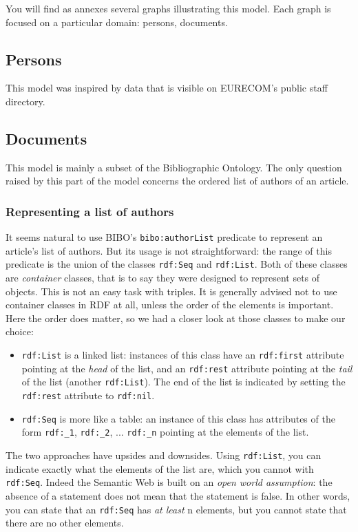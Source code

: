 \documentclass[a4paper,11pt]{report}
\begin{document}
You will find as annexes several graphs illustrating this model. Each graph is focused on a particular domain: persons, documents.
\subsection*{Persons}
This model was inspired by data that is visible on \mbox{EURECOM's} public staff directory. 

\subsection*{Documents}
This model is mainly a subset of the Bibliographic Ontology. The only question raised by this part of the model concerns the ordered list of authors of an article. 
\subsubsection*{Representing a list of authors}
It seems natural to use BIBO's \texttt{bibo:authorList} predicate to represent an article's list of authors.  But its usage is not straightforward: the range of this predicate is the union of the classes  \texttt{rdf:Seq} and  \texttt{rdf:List}. Both of these classes are \emph{container} classes, that is to say they were designed to represent sets of objects. This is not an easy task with triples. It is generally advised not to use container classes in RDF at all, unless the order of the elements is important. Here the order does matter, so we had a closer look at those classes to make our choice: 
\begin{itemize}
\item \texttt{rdf:List} is a linked list: instances of this class have an \texttt{rdf:first} attribute pointing at the \emph{head} of the list, and an \texttt{rdf:rest} attribute pointing at the \emph{tail} of the list (another \texttt{rdf:List}). The end of the list is indicated by setting the \texttt{rdf:rest} attribute to \texttt{rdf:nil}. 
\item \texttt{rdf:Seq} is more like a table: an instance of this class has attributes of the form \texttt{rdf:{\_}1}, \texttt{rdf:{\_}2}, ... \texttt{rdf:{\_}n} pointing at the elements of the list. 
\end{itemize}

The two approaches have upsides and downsides. Using \texttt{rdf:List}, you can indicate exactly what the elements of the list are, which you cannot with \texttt{rdf:Seq}. Indeed the Semantic Web is built on an \emph{open world assumption}: the absence of a statement does not mean that the statement is false. In other words, you can state that an \texttt{rdf:Seq} has \emph{at least} n elements, but you cannot state that there are no other elements. 
\end{document}
